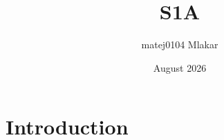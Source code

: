 \documentclass{article}
\title{S1A}
\author{matej0104 Mlakar}
\date{August 2026}
\begin{document}
\maketitle

\section{Introduction}
\end{document}
